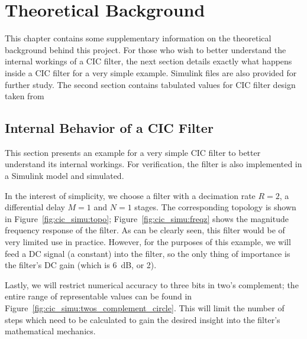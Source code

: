 %
%
\chapter{Theoretical Background} %
\label{ch:app:theoretical_background}

This  chapter  contains  some  supplementary information  on  the  theoretical
background behind  this project. For those  who wish to better  understand the
internal  workings of  a CIC  filter, the  next section  details exactly  what
happens inside a CIC filter for a very simple example. Simulink files are also
provided for further  study. The second section contains  tabulated values for
CIC filter design taken from~\cite{1163535}

\section{Internal Behavior of a CIC Filter} %
\label{sec:app:cic_simu}

This  section presents  an example  for  a very  simple CIC  filter to  better
understand  its  internal  workings. For  verification,  the  filter  is  also
implemented in a Simulink model and simulated.

In the interest of simplicity, we choose  a filter with a decimation rate $R =
2$, a differential delay $M=1$ and $N=1$ stages. The corresponding topology is
shown in Figure~\ref{fig:cic_simu:topo}; Figure~\ref{fig:cic_simu:freqz} shows
the magnitude frequency  response of the filter. As can be  clearly seen, this
filter would be of very limited  use in practice. However, for the purposes of
this example, we  will feed a DC  signal (a constant) into the  filter, so the
only thing  of importance is  the filter's DC  gain (which is  \SI{6}{\dB}, or
\num{2}).

Lastly,  we  will   restrict  numerical  accuracy  to  three   bits  in  two's
complement;  the  entire  range  of  representable  values  can  be  found  in
Figure~\ref{fig:cic_simu:twos_complement_circle}. This  will limit  the number
of steps  which need  to be calculated  to gain the  desired insight  into the
filter's mathematical mechanics.

